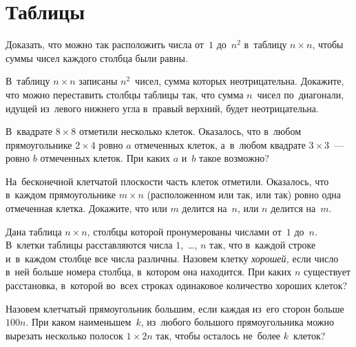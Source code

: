 
\section*{Таблицы}


\begin{problems}

\item
Доказать, что можно так расположить числа от~$1$ до~$n^2$
в~таблицу $n \times n$, чтобы суммы чисел каждого столбца были равны.

\item
В~таблицу $n \times n$ записаны $n^2$~чисел, сумма которых неотрицательна.
Докажите, что можно переставить столбцы таблицы так, что сумма $n$~чисел
по~диагонали, идущей из~левого нижнего угла в~правый верхний, будет
неотрицательна.

\item
В~квадрате $8 \times 8$ отметили несколько клеток.
Оказалось, что в~любом прямоугольнике $2 \times 4$ ровно $a$ отмеченных клеток,
а~в~любом квадрате $3 \times 3$~--- ровно $b$ отмеченных клеток.
При каких $a$ и~$b$ такое возможно?

\item
На~бесконечной клетчатой плоскости часть клеток отметили.
Оказалось, что в~каждом прямоугольнике $m \times n$
(расположенном или так, или так) ровно одна отмеченная клетка.
Докажите, что или $m$ делится на~$n$, или $n$ делится на~$m$.

\item
Дана таблица $n \times n$, столбцы которой пронумерованы числами от~$1$ до~$n$.
В~клетки таблицы расставляются числа $1$,~\ldots, $n$ так, что в~каждой строке
и~в~каждом столбце все числа различны.
Назовем клетку \emph{хорошей,} если число в~ней больше номера столбца,
в~котором она находится.
При каких $n$ существует расстановка, в~которой во~всех строках одинаковое
количество хороших клеток?

\item
Назовем клетчатый прямоугольник большим, если каждая из~его сторон больше
$100 n$.
При каком наименьшем~$k$, из~любого большого прямоугольника можно вырезать
несколько полосок $1 \times 2 n$ так, чтобы осталось не~более $k$~клеток?

\end{problems}


